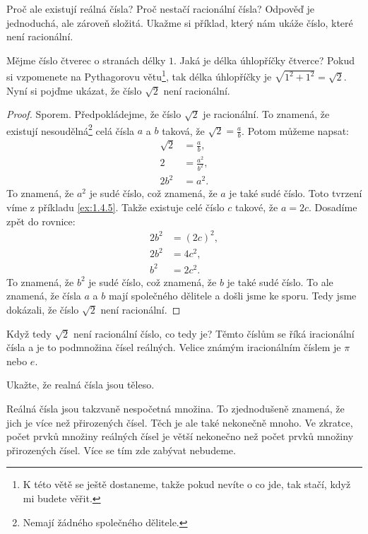 Proč ale existují reálná čísla? Proč nestačí racionální čísla? Odpověď je jednoduchá, ale zároveň složitá. Ukažme si příklad, který nám ukáže číslo, které není racionální.

\begin{example}
  Mějme číslo čtverec o stranách délky $1$. Jaká je délka úhlopříčky čtverce? Pokud si vzpomenete na Pythagorovu větu\footnote{K této větě se ještě dostaneme, takže pokud nevíte o co jde, tak stačí, když mi budete věřit.}, tak délka úhlopříčky je $\sqrt{1^2 + 1^2} = \sqrt{2}$. Nyní si pojďme ukázat, že číslo $\sqrt{2}$ není racionální.

  \begin{proof}
    Sporem. Předpokládejme, že číslo $\sqrt{2}$ je racionální. To znamená, že existují nesoudělná\footnote{Nemají žádného společného dělitele.} celá čísla $a$ a $b$ taková, že $\sqrt{2} = \frac{a}{b}$. Potom můžeme napsat:
    \begin{align*}
      \sqrt{2} &= \frac{a}{b},\\
      2 &= \frac{a^2}{b^2},\\
      2b^2 &= a^2.
    \end{align*}
    To znamená, že $a^2$ je sudé číslo, což znamená, že $a$ je také sudé číslo. Toto tvrzení víme z příkladu \ref{ex:1.4.5}. Takže existuje celé číslo $c$ takové, že $a = 2c$. Dosadíme zpět do rovnice:
    \begin{align*}
      2b^2 &= {(2c)}^2,\\ 
      2b^2 &= 4c^2,\\
      b^2 &= 2c^2.
    \end{align*}
    To znamená, že $b^2$ je sudé číslo, což znamená, že $b$ je také sudé číslo. To ale znamená, že čísla $a$ a $b$ mají společného dělitele a došli jsme ke sporu. Tedy jsme dokázali, že číslo $\sqrt{2}$ není racionální.
  \end{proof}
\end{example}

Když tedy $\sqrt{2}$ není racionální číslo, co tedy je? Těmto číslům se říká iracionální čísla a je to podmnožina čísel reálných. Velice známým iracionálním číslem je $\pi$ nebo $e$.

\begin{problem}
  Ukažte, že realná čísla jsou těleso.
\end{problem}

\begin{note}
  Reálná čísla jsou takzvaně nespočetná množina. To zjednodušeně znamená, že jich je více než přirozených čísel. Těch je ale také nekonečně mnoho. Ve zkratce, počet prvků množiny reálných čísel je větší nekonečno než počet prvků množiny přirozených čísel. Více se tím zde zabývat nebudeme.
\end{note}

